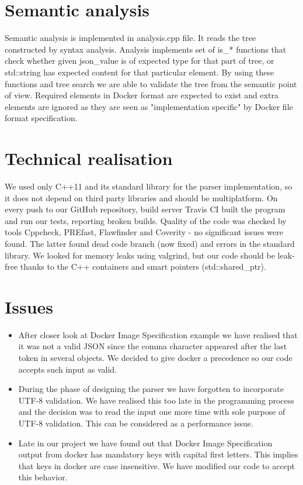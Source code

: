 \documentclass[paper=a4, fontsize=11pt, abstract=on]{scrartcl} %
\numberwithin{equation}{section} %
\numberwithin{figure}{section} %
\numberwithin{table}{section} %
\begin{document}
\section{Semantic analysis}

Semantic analysis is implemented in analysis.cpp file. It reads the tree constructed by syntax analysis. Analysis implements set of is\_* functions that check whether given json\_value is of expected type for that part of tree, or std::string has expected content for that particular element. By using these functions and tree search we are able to validate the tree from the semantic point of view. Required elements in Docker format are expected to exist and extra elements are ignored as they are seen as "implementation specific" by Docker file format specification.


\section{Technical realisation}
We used only C++11 and its standard library for the parser implementation, so it does not
depend on third party libraries and should be multiplatform. On every push to our GitHub
repository, build server Travis CI built the program and run our tests, reporting broken builds.
Quality of the code was checked by tools Cppcheck, PREfast, Flawfinder and Coverity - no significant
issues were found. The latter found dead code branch (now fixed) and errors in the standard library.
We looked for memory leaks using valgrind, but our code should be leak-free thanks to the C++ containers
and smart pointers (std::shared\_ptr).

\section{Issues}
\begin{itemize}

    \item After closer look at Docker Image Specification example we have
        realised that it was not a valid JSON since the comma character
        appeared after the last token in several objects. We decided to give
        docker a precedence so our code accepts such input as valid.

    \item During the phase of designing the parser we have forgotten to
        incorporate UTF-8 validation. We have realised this too late in the
        programming process and the decision was to read the input one more time
        with sole purpose of UTF-8 validation. This can be considered as a
        performance issue.

    \item Late in our project we have found out that Docker Image Specification
        output from docker has mandatory keys with capital first letters. This
        implies that keys in docker are case insensitive. We have modified our
        code to accept this behavior.

\end{itemize}
\end{document}
